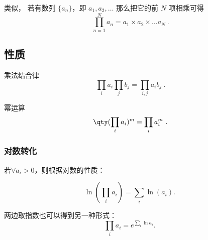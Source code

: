 
\begin{issues}
\issueDraft
\end{issues}

类似， 若有数列 $\{a_n\}$，即 $a_1, a_2, \dots$ 那么把它的前 $N$ 项相乘可得
\begin{equation}
\prod_{n = 1}^N a_n = a_1\times a_2\times \dots a_N~.
\end{equation}

\subsection{性质}
乘法结合律
\begin{equation}
\prod_i a_i \prod_j b_j =  \prod_{i,j} a_i b_j~.
\end{equation}

幂运算
\begin{equation}
\qty(\prod_i a_i)^m =  \prod_i a_i^m~.
\end{equation}

\subsubsection{对数转化}

若$\forall a_i > 0$，则根据对数的性质：

\begin{equation}
\ln \left( \prod_i a_i \right) = \sum_i \ln(a_i).~
\end{equation}

两边取指数也可以得到另一种形式：
\begin{equation}
\prod_i a_i = e^{\displaystyle\sum_i \ln {a_i}}.~
\end{equation}


